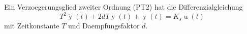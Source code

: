Ein Verzoegerungsglied zweiter Ordnung (PT2) hat die Differenzialgleichung
$$T^2 \ddot{\operatorname{y}}(t) + 2 d T \dot{\operatorname{y}}(t) + \operatorname{y}(t) = K_s \operatorname{u}(t)$$ mit Zeitkonstante $T$ und Daempfungsfaktor $d$.
